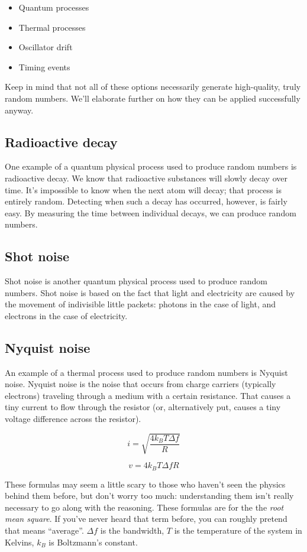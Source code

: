 \documentclass[11pt,ebook,table,dvipsnames]{memoir}
\begin{document}
\begin{itemize}
\item Quantum processes
\item Thermal processes
\item Oscillator drift
\item Timing events
\end{itemize}

Keep in mind that not all of these options necessarily generate
high-quality, truly random numbers. We'll elaborate further on how
they can be applied successfully anyway.

\subsection{Radioactive decay}
\label{sec-2-10-2-1}

One example of a quantum physical process used to produce random
numbers is radioactive decay. We know that radioactive substances will
slowly decay over time. It's impossible to know when the next atom
will decay; that process is entirely random. Detecting when such a
decay has occurred, however, is fairly easy. By measuring the time
between individual decays, we can produce random numbers.
\subsection{Shot noise}
\label{sec-2-10-2-2}

Shot noise is another quantum physical process used to produce random
numbers. Shot noise is based on the fact that light and electricity
are caused by the movement of indivisible little packets: photons in
the case of light, and electrons in the case of electricity.
\subsection{Nyquist noise}
\label{sec-2-10-2-3}

An example of a thermal process used to produce random numbers is
Nyquist noise. Nyquist noise is the noise that occurs from charge
carriers (typically electrons) traveling through a medium with a
certain resistance. That causes a tiny current to flow through the
resistor (or, alternatively put, causes a tiny voltage difference
across the resistor).

\[
i = \sqrt{\frac{4 k_B T \Delta f}{R}}
\]

\[
v = 4 k_B T \Delta f R
\]

These formulas may seem a little scary to those who haven't seen the
physics behind them before, but don't worry too much: understanding
them isn't really necessary to go along with the reasoning. These
formulas are for the the \emph{root mean square}. If you've never heard
that term before, you can roughly pretend that means \enquote{average}.
$\Delta f$ is the bandwidth, $T$ is the temperature of the system in
Kelvins, $k_B$ is Boltzmann's constant.
\end{document}
